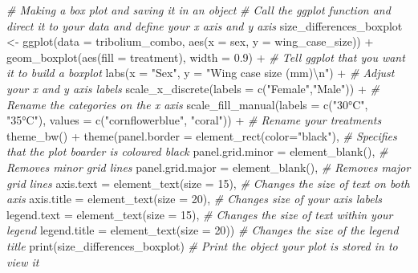 \documentclass[
]{book}
\newenvironment{Shaded}{\begin{snugshade}}{\end{snugshade}}
\newcommand{\AttributeTok}[1]{\textcolor[rgb]{0.77,0.63,0.00}{#1}}
\newcommand{\CommentTok}[1]{\textcolor[rgb]{0.56,0.35,0.01}{\textit{#1}}}
\newcommand{\DecValTok}[1]{\textcolor[rgb]{0.00,0.00,0.81}{#1}}
\newcommand{\FloatTok}[1]{\textcolor[rgb]{0.00,0.00,0.81}{#1}}
\newcommand{\FunctionTok}[1]{\textcolor[rgb]{0.00,0.00,0.00}{#1}}
\newcommand{\NormalTok}[1]{#1}
\newcommand{\OtherTok}[1]{\textcolor[rgb]{0.56,0.35,0.01}{#1}}
\newcommand{\SpecialCharTok}[1]{\textcolor[rgb]{0.00,0.00,0.00}{#1}}
\newcommand{\StringTok}[1]{\textcolor[rgb]{0.31,0.60,0.02}{#1}}
\begin{document}
\begin{Shaded}
\begin{Highlighting}[]
\CommentTok{\# Making a box plot and saving it in an object}
\CommentTok{\# Call the ggplot function and direct it to your data and define your x axis and y axis}
\NormalTok{size\_differences\_boxplot }\OtherTok{\textless{}{-}} \FunctionTok{ggplot}\NormalTok{(}\AttributeTok{data =}\NormalTok{ tribolium\_combo, }\FunctionTok{aes}\NormalTok{(}\AttributeTok{x =}\NormalTok{ sex, }\AttributeTok{y =}\NormalTok{ wing\_case\_size)) }\SpecialCharTok{+} 
  \FunctionTok{geom\_boxplot}\NormalTok{(}\FunctionTok{aes}\NormalTok{(}\AttributeTok{fill =}\NormalTok{ treatment), }\AttributeTok{width =} \FloatTok{0.9}\NormalTok{) }\SpecialCharTok{+} \CommentTok{\# Tell ggplot that you want it to build a boxplot}
  \FunctionTok{labs}\NormalTok{(}\AttributeTok{x =} \StringTok{"Sex"}\NormalTok{, }\AttributeTok{y =} \StringTok{"Wing case size (mm)}\SpecialCharTok{\textbackslash{}n}\StringTok{"}\NormalTok{) }\SpecialCharTok{+} \CommentTok{\# Adjust your x and y axis labels }
  \FunctionTok{scale\_x\_discrete}\NormalTok{(}\AttributeTok{labels =} \FunctionTok{c}\NormalTok{(}\StringTok{"Female"}\NormalTok{,}\StringTok{"Male"}\NormalTok{)) }\SpecialCharTok{+} \CommentTok{\# Rename the categories on the x axis }
  \FunctionTok{scale\_fill\_manual}\NormalTok{(}\AttributeTok{labels =} \FunctionTok{c}\NormalTok{(}\StringTok{"30°C"}\NormalTok{, }\StringTok{"35°C"}\NormalTok{), }\AttributeTok{values =} \FunctionTok{c}\NormalTok{(}\StringTok{"cornflowerblue"}\NormalTok{, }\StringTok{"coral"}\NormalTok{)) }\SpecialCharTok{+} \CommentTok{\# Rename your treatments}
  \FunctionTok{theme\_bw}\NormalTok{() }\SpecialCharTok{+}
  \FunctionTok{theme}\NormalTok{(}\AttributeTok{panel.border =} \FunctionTok{element\_rect}\NormalTok{(}\AttributeTok{color=}\StringTok{"black"}\NormalTok{), }\CommentTok{\# Specifies that the plot boarder is coloured black}
        \AttributeTok{panel.grid.minor =} \FunctionTok{element\_blank}\NormalTok{(), }\CommentTok{\# Removes minor grid lines }
        \AttributeTok{panel.grid.major =} \FunctionTok{element\_blank}\NormalTok{(), }\CommentTok{\# Removes major grid lines }
        \AttributeTok{axis.text =} \FunctionTok{element\_text}\NormalTok{(}\AttributeTok{size =} \DecValTok{15}\NormalTok{), }\CommentTok{\# Changes the size of text on both axis }
        \AttributeTok{axis.title =} \FunctionTok{element\_text}\NormalTok{(}\AttributeTok{size =} \DecValTok{20}\NormalTok{), }\CommentTok{\# Changes size of your axis labels }
        \AttributeTok{legend.text =} \FunctionTok{element\_text}\NormalTok{(}\AttributeTok{size =} \DecValTok{15}\NormalTok{), }\CommentTok{\# Changes the size of text within your legend}
        \AttributeTok{legend.title =} \FunctionTok{element\_text}\NormalTok{(}\AttributeTok{size =} \DecValTok{20}\NormalTok{)) }\CommentTok{\# Changes the size of the legend title  }
\FunctionTok{print}\NormalTok{(size\_differences\_boxplot) }\CommentTok{\# Print the object your plot is stored in to view it}
\end{Highlighting}
\end{Shaded}
\end{document}
